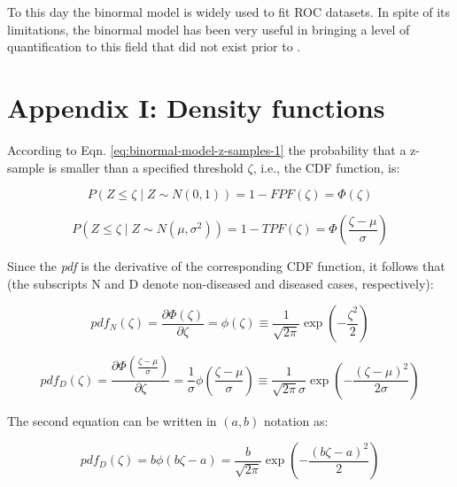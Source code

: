 \documentclass[
]{book}
\begin{document}
To this day the binormal model is widely used to fit ROC datasets. In spite of its limitations, the binormal model has been very useful in bringing a level of quantification to this field that did not exist prior to \citep{RN1081}.

\hypertarget{binormal-model-pdf-curves-appendix-1}{%
\section{Appendix I: Density functions}\label{binormal-model-pdf-curves-appendix-1}}

According to Eqn. \eqref{eq:binormal-model-z-samples-1} the probability that a z-sample is smaller than a specified threshold \(\zeta\), i.e., the CDF function, is:

\begin{equation*} 
P\left ( Z \le \zeta \mid  Z\sim N\left ( 0,1 \right ) \right ) = 1-FPF\left ( \zeta \right ) = \Phi \left ( \zeta  \right )
\end{equation*}

\begin{equation*} 
P\left ( Z \le \zeta \mid  Z\sim N\left ( \mu,\sigma^2 \right ) \right ) = 1-TPF\left ( \zeta \right ) = \Phi \left ( \frac{\zeta - \mu}{\sigma}  \right )
\end{equation*}

Since the \emph{pdf} is the derivative of the corresponding CDF function, it follows that (the subscripts N and D denote non-diseased and diseased cases, respectively):

\begin{equation*} 
pdf_N\left ( \zeta \right ) = \frac{\partial \Phi\left ( \zeta \right )}{\partial \zeta} = \phi\left ( \zeta \right ) \equiv \frac{1}{\sqrt{2 \pi}}\exp\left ( -\frac{\zeta^2}{2} \right )
\end{equation*}

\begin{equation*} 
pdf_D\left ( \zeta \right ) = \frac{\partial \Phi\left ( \frac{\zeta - \mu}{\sigma} \right )}{\partial \zeta} = \frac{1}{\sigma} \phi\left ( \frac{\zeta - \mu}{\sigma} \right ) \equiv \frac{1}{\sqrt{2 \pi}\sigma}\exp\left ( -\frac{\left (\zeta-\mu  \right )^2}{2\sigma} \right )
\end{equation*}

The second equation can be written in \((a,b)\) notation as:

\begin{equation*} 
pdf_D\left ( \zeta \right ) = b\phi\left ( b\zeta-a \right ) = \frac{b}{\sqrt{2 \pi}}\exp\left ( -\frac{\left (b\zeta - a \right )^2}{2} \right )
\end{equation*}
\end{document}
